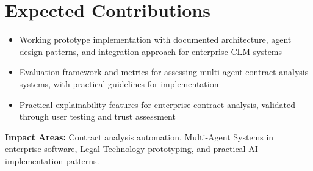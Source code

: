 
\section{Expected Contributions}\label{section:expected_contributions}


\begin{itemize}
    \item Working prototype implementation with documented architecture, agent design patterns, and integration approach for enterprise CLM systems
    \item Evaluation framework and metrics for assessing multi-agent contract analysis systems, with practical guidelines for implementation
    \item Practical explainability features for enterprise contract analysis, validated through user
    testing and trust assessment
\end{itemize}

\textbf{Impact Areas:} Contract analysis automation, Multi-Agent Systems in enterprise software, Legal Technology prototyping, and practical AI implementation patterns.

